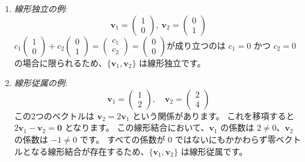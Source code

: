 \begin{ex}
\begin{enumerate}
\item \emph{線形独立の例}:\\
    \[\bm{v}_1 = \begin{pmatrix} 1 \\ 0 \end{pmatrix},\ \bm{v}_2 = \begin{pmatrix} 0 \\ 1 \end{pmatrix}\]
    $c_1 \begin{pmatrix} 1 \\ 0 \end{pmatrix} + c_2 \begin{pmatrix} 0 \\ 1 \end{pmatrix} = \begin{pmatrix} c_1 \\ c_2 \end{pmatrix} = \begin{pmatrix} 0 \\ 0 \end{pmatrix}$が成り立つのは $c_1=0$ かつ $c_2=0$ の場合に限られるため、$\{\bm{v}_1, \bm{v}_2\}$ は線形独立です。
\item \emph{線形従属の例}:\\
    \[\bm{v}_1 = \begin{pmatrix} 1 \\ 2 \end{pmatrix}, \quad \bm{v}_2 = \begin{pmatrix} 2 \\ 4 \end{pmatrix}\]
    この2つのベクトルは $\bm{v}_2 = 2\bm{v}_1$ という関係があります。
    これを移項すると $2\bm{v}_1 - \bm{v}_2 = \bm{0}$ となります。
    この線形結合において、$\bm{v}_1$ の係数は $2 \neq 0$、$\bm{v}_2$ の係数は $-1 \neq 0$ です。
    すべての係数が $0$ ではないにもかかわらず零ベクトルとなる線形結合が存在するため、$\{\bm{v}_1, \bm{v}_2\}$ は線形従属です。
\end{enumerate}
\end{ex}

